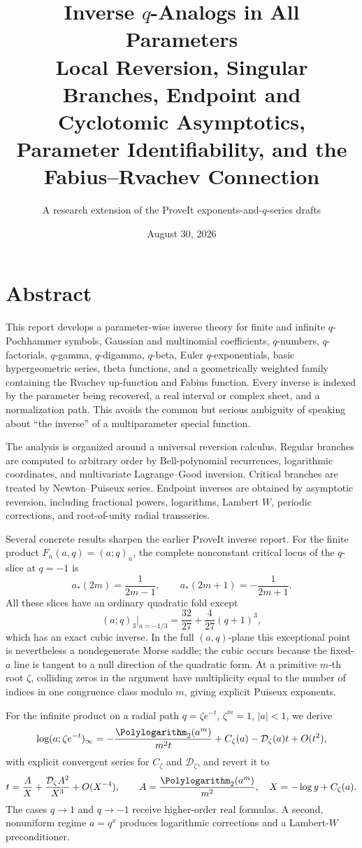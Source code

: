 \documentclass[11pt,letterpaper,oneside,openany]{book}
\title{\Huge Inverse \(q\)-Analogs in All Parameters\\[0.45em]
\Large Local Reversion, Singular Branches, Endpoint and Cyclotomic Asymptotics,\\
Parameter Identifiability, and the Fabius--Rvachev Connection}
\author{A research extension of the ProveIt exponents-and-\(q\)-series drafts}
\date{August 30, 2026}
\theoremstyle{definition}
\theoremstyle{remark}
\newcommand{\Dcal}{\mathcal D}
\begin{document}
\frontmatter
\hypersetup{pageanchor=false}
\maketitle
\clearpage
\hypersetup{pageanchor=true}

\chapter*{Abstract}
This report develops a parameter-wise inverse theory for finite and infinite
\(q\)-Pochhammer symbols, Gaussian and multinomial coefficients, \(q\)-numbers,
\(q\)-factorials, \(q\)-gamma, \(q\)-digamma, \(q\)-beta, Euler
\(q\)-exponentials, basic hypergeometric series, theta functions, and a
geometrically weighted family containing the Rvachev up-function and Fabius
function.  Every inverse is indexed by the parameter being recovered, a real
interval or complex sheet, and a normalization path.  This avoids the common
but serious ambiguity of speaking about ``the inverse'' of a multiparameter
special function.

The analysis is organized around a universal reversion calculus.  Regular
branches are computed to arbitrary order by Bell-polynomial recurrences,
logarithmic coordinates, and multivariate Lagrange--Good inversion.  Critical
branches are treated by Newton--Puiseux series.  Endpoint inverses are obtained
by asymptotic reversion, including fractional powers, logarithms, Lambert
\(W\), periodic corrections, and root-of-unity radial transseries.

Several concrete results sharpen the earlier ProveIt inverse report.  For the
finite product \(F_n(a,q)=(a;q)_n\), the complete nonconstant critical locus of
the \(q\)-slice at \(q=-1\) is
\[
 a_*(2m)=\frac1{2m-1},
 \qquad
 a_*(2m+1)=-\frac1{2m+1}.
\]
All these slices have an ordinary quadratic fold except
\[
 (a;q)_3\big|_{a=-1/3}=\frac{32}{27}+\frac4{27}(q+1)^3,
\]
which has an exact cubic inverse.  In the full \((a,q)\)-plane this exceptional
point is nevertheless a nondegenerate Morse saddle; the cubic occurs because
the fixed-\(a\) line is tangent to a null direction of the quadratic form.  At
a primitive \(m\)-th root \(\zeta\), colliding zeros in the argument have
multiplicity equal to the number of indices in one congruence class modulo
\(m\), giving explicit Puiseux exponents.

For the infinite product on a radial path \(q=\zeta e^{-t}\), \(\zeta^m=1\),
\(|a|<1\), we derive
\[
 \log(a;\zeta e^{-t})_\infty
 =-\frac{\Polylogarithm_2(a^m)}{m^2t}+C_\zeta(a)-\Dcal_\zeta(a)t+O(t^2),
\]
with explicit convergent series for \(C_\zeta\) and \(\Dcal_\zeta\), and revert
it to
\[
 t=\frac{A}{X}+\frac{\Dcal_\zeta A^2}{X^3}+O(X^{-4}),
 \qquad A=\frac{\Polylogarithm_2(a^m)}{m^2},\quad X=-\log y+C_\zeta(a).
\]
The cases \(q\to1\) and \(q\to-1\) receive higher-order real formulas.  A
second, nonuniform regime \(a=q^x\) produces logarithmic corrections and a
Lambert-\(W\) preconditioner.
\end{document}
